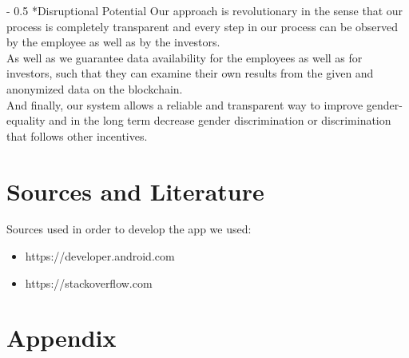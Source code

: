 \documentclass[portrait,a4paper]{article}
\makeatletter
\renewcommand\paragraph{\@startsection{paragraph}{4}{0mm}%
	{-\baselineskip}%
	{0.5\baselineskip}%
	{\normalfont\bfseries}%
}%
\makeatother
\begin{document}
	\paragraph*{Disruptional Potential}
		Our approach is revolutionary in the sense that our process is completely transparent and every step in our process
		can be observed by the employee as well as by the investors.\\
		As well as we guarantee data availability for the employees as well as for investors, such that they can
		examine their own results from the given and anonymized data on the blockchain.\\
		
		And finally, our system allows a reliable and transparent way to improve gender-equality and in the long term
		decrease gender discrimination or discrimination that follows other incentives.
		
\section{Sources and Literature}
	Sources used in order to develop the app we used:
	\begin{itemize}
		\item https://developer.android.com
		\item https://stackoverflow.com
	\end{itemize}
	

\clearpage


\section{Appendix}
	
\end{document}
